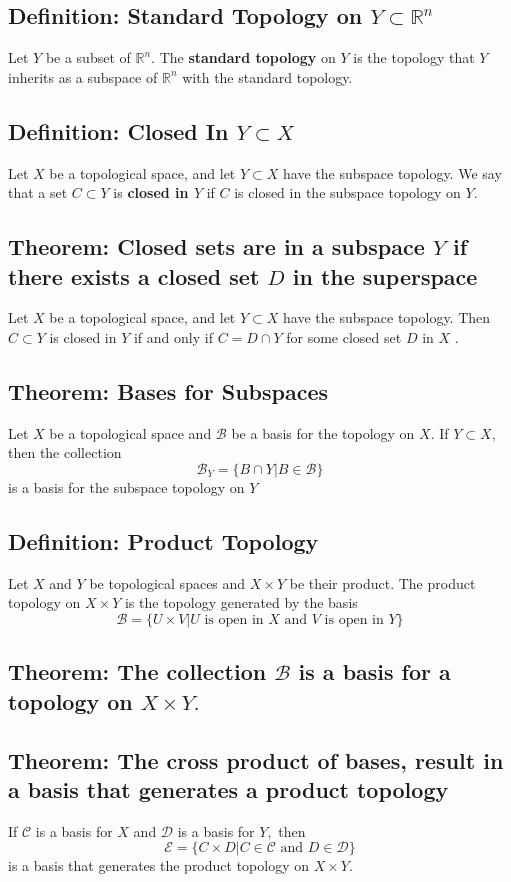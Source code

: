 \documentclass[12pt]{article}
\newcommand{\R}{\mathds{R}}
\begin{document}
\subsection{Definition: Standard Topology on $ Y \subset \R^n $}
	Let $ Y $ be a subset of $ \R^n $. The \textbf{standard topology} on $ Y $ is the topology that $Y$ inherits as a subspace of $\mathbb { R } ^ { n }$ with the standard topology.
\subsection{Definition: Closed In $ Y \subset X $}
	Let $X$ be a topological space, and let $Y \subset X$ have the subspace topology. We say that a set $C \subset Y$ is \textbf{closed in $Y$} if $C$ is closed in the subspace topology on $Y .$
\subsection{Theorem: Closed sets are in a subspace $ Y $ if there exists a closed set $ D $ in the superspace} 
	Let $X$ be a topological space, and let $Y \subset X$ have the subspace topology. Then $C \subset Y$ is closed in $Y$ if and only if $C = D \cap Y$ for some closed set $D$ in $X$ .
\subsection{Theorem: Bases for Subspaces}
	Let $X$ be a topological space and $\mathcal { B }$ be a basis for the topology on $X .$ If $Y \subset X ,$ then the collection
		\[\mathcal { B } _ { Y } = \{ B \cap Y | B \in \mathcal { B } \}\]
	is a basis for the subspace topology on $ Y $
\subsection{Definition: Product Topology}
	Let $X$ and $Y$ be topological spaces and $X \times Y$ be their product. The product topology on $X \times Y$ is the topology generated by the basis
	\[\mathcal { B } = \{ U \times V | U \text { is open in } X \text { and } V \text { is open in } Y \}\]
\subsection{Theorem: The collection $\mathcal { B }$ is a basis for a topology on $X \times Y .$}
\subsection{Theorem: The cross product of bases, result in a basis that generates a product topology}
	If $\mathcal { C }$ is a basis for $X$ and $\mathcal { D }$ is a basis for $Y ,$ then
		\[\mathcal { E } = \{ C \times D | C \in \mathcal { C } \text { and } D \in \mathcal { D } \}\]
	is a basis that generates the product topology on $X \times Y .$
\end{document}
